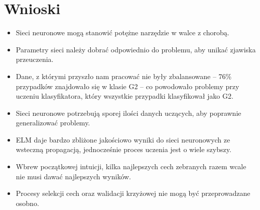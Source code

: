\chapter{Wnioski}
\begin{itemize}
	\item{Sieci neuronowe mogą stanowić potężne narzędzie w walce z chorobą.}
	\item{Parametry sieci należy dobrać odpowiednio do problemu, aby unikać zjawiska przeuczenia.}
	\item{Dane, z którymi przyszło nam pracować nie były zbalansowane -- 76\% przypadków znajdowało się w klasie G2 -- co powodowało problemy przy uczeniu klasyfikatora, który wszystkie przypadki klasyfikował jako G2.}
	\item{Sieci neuronowe potrzebują sporej ilości danych uczących, aby poprawnie generalizować problemy.}
	\item{ELM daje bardzo zbliżone jakościowo wyniki do sieci neuronowych ze wsteczną propagacją, jednocześnie proces uczenia jest o wiele szybszy.}
	\item{Wbrew początkowej intuicji, kilka najlepszych cech zebranych razem wcale nie musi dawać najlepszych wyników.}
	\item{Procesy selekcji cech oraz walidacji krzyżowej nie mogą być przeprowadzane osobno.}
\end{itemize}